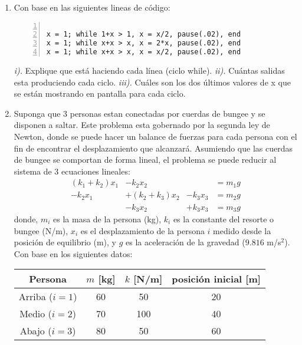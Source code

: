 \documentclass[letterpaper,12pt]{exam}
\begin{document}
\begin{enumerate}
 \item Con base en las siguientes lineas de código:
 \lstset{language=Matlab}
\begin{lstlisting}[numbers=left]

x = 1; while 1+x > 1, x = x/2, pause(.02), end
x = 1; while x+x > x, x = 2*x, pause(.02), end
x = 1; while x+x > x, x = x/2, pause(.02), end
 \end{lstlisting}

 \emph{i).} Explique que está haciendo cada línea (ciclo while). \emph{ii).} Cuántas salidas esta produciendo cada ciclo. \emph{iii).} Cuáles son los dos últimos valores de x que se están mostrando en pantalla para cada ciclo.

 \item Suponga que 3 personas estan conectadas por cuerdas de bungee y se disponen a saltar. Este problema esta gobernado por la segunda ley de Newton, donde se puede hacer un balance de fuerzas para cada persona con el fin de encontrar el desplazamiento que alcanzará. Asumiendo que las cuerdas de bungee se comportan de forma lineal, el problema se puede reducir al sistema de 3 ecuaciones lineales: 
 \begin{equation}
   \begin{matrix}
   (k_1+k_2)x_1 &- k_2x_2       &          &= m_1g \\
   -k_2x_1      &+ (k_2+k_3)x_2 &- k_3x_3  &= m_2g \\
                &- k_3x_2       &+ k_3x_3  &= m_3g 
   \end{matrix}
 \end{equation}
 donde, $m_i$ es la masa de la persona (kg), $k_i$ es la constante del resorte o bungee (N/m), $x_i$ es el desplazamiento de la persona $i$ medido desde la posición de equilibrio (m), y  $g$ es la aceleración de la gravedad ($9.816$ m/s$^2$). Con base en los siguientes datos:
 \begin{table}[h!]
 \centering
 \begin{tabular}{c|c|c|c}
  Persona        & $m$ [kg] & $k$ [N/m] & posición inicial [m]\\
  \hline
  Arriba ($i=1$) &  60      &  50       & 20 \\
  Medio  ($i=2$) &  70      &  100      & 40 \\
  Abajo  ($i=3$) &  80      &  50       & 60  
 \end{tabular}
 \end{table}
 

\end{enumerate}
\end{document}
